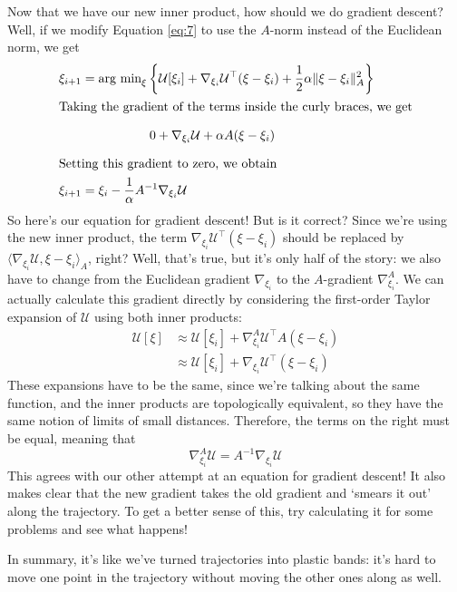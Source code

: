 \documentclass[twoside]{article}
\newcommand{\cu}{\mathcal{U}}
\begin{document}
Now that we have our new inner product, how should we do gradient descent? Well, if we modify Equation \eqref{eq:7} to use the $A$-norm instead of the Euclidean norm, we get
\begin{align}
  \label{eq:8}
  \xi_{i+1} &= \text{arg min}_\xi \left\{ \cu[\xi_i] + \nabla_{\xi_i}\cu^\top(\xi - \xi_i) + \frac{1}{2}\alpha \| \xi - \xi_i \|_A^2 \right\}\\
  \intertext{Taking the gradient of the terms inside the curly braces, we get}
            &\phantom{- \text{arg min}_\xi \bigg\{  }0 + \nabla_{\xi_i}\cu + \alpha A (\xi - \xi_i) \label{eq:17} \\
  \intertext{Setting this gradient to zero, we obtain}
  \xi_{i + 1} &= \xi_i - \frac{1}{\alpha} A^{-1}\nabla_{\xi_i}\cu
\end{align}
So here's our equation for gradient descent! But is it correct? Since we're using the new inner product, the term $\nabla_{\xi_i}\cu^\top(\xi - \xi_i)$ should be replaced by $\langle \nabla_{\xi_i}\cu, \xi - \xi_i \rangle_A$, right? Well, that's true, but it's only half of the story: we also have to change from the Euclidean gradient $\nabla_{\xi_i}$ to the $A$-gradient $\nabla^A_{\xi_i}$. We can actually calculate this gradient directly by considering the first-order Taylor expansion of $\cu$ using both inner products:
\begin{align}
  \label{eq:18}
  \cu[\xi] &\approx \cu[\xi_i] + \nabla^A_{\xi_i}\cu^\top A (\xi - \xi_i) \\
\label{eq:19}  &\approx \cu[\xi_i] + \nabla_{\xi_i} \cu^\top (\xi - \xi_i)
\end{align}
These expansions have to be the same, since we're talking about the same function, and the inner products are topologically equivalent, so they have the same notion of limits of small distances. Therefore, the terms on the right must be equal, meaning that
\begin{equation}
  \label{eq:20}
  \nabla_{\xi_i}^A \cu = A^{-1} \nabla_{\xi_i}\cu
\end{equation}
This agrees with our other attempt at an equation for gradient descent! It also makes clear that the new gradient takes the old gradient and `smears it out' along the trajectory. To get a better sense of this, try calculating it for some problems and see what happens!

In summary, it's like we've turned trajectories into plastic bands: it's hard to move one point in the trajectory without moving the other ones along as well.
\end{document}
